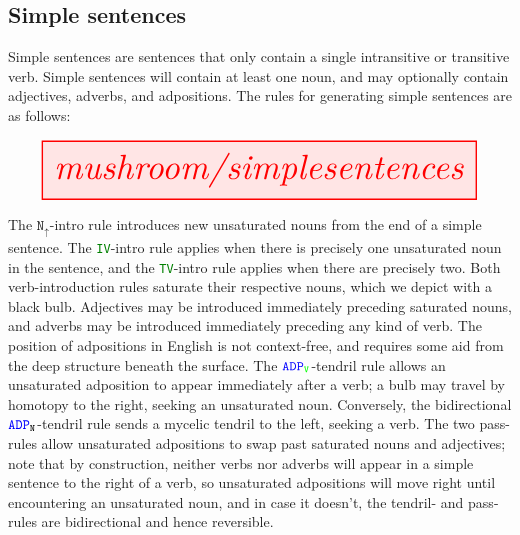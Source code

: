 

\subsection{Simple sentences}

Simple sentences are sentences that only contain a single intransitive or transitive verb. Simple sentences will contain at least one noun, and may optionally contain adjectives, adverbs, and adpositions. The rules for generating simple sentences are as follows:

\[
\resizebox{\textwidth}{!}{\tikzfig{mushroom/simplesentences}}
\]

The $\texttt{N}_\uparrow$-intro rule introduces new unsaturated nouns from the end of a simple sentence. The \textcolor{green}{\texttt{IV}}-intro rule applies when there is precisely one unsaturated noun in the sentence, and the \textcolor{green}{\texttt{TV}}-intro rule applies when there are precisely two. Both verb-introduction rules saturate their respective nouns, which we depict with a black bulb. Adjectives may be introduced immediately preceding saturated nouns, and adverbs may be introduced immediately preceding any kind of verb. The position of adpositions in English is not context-free, and requires some aid from the deep structure beneath the surface. The $\textcolor{blue}{\texttt{ADP}}_{\textcolor{green}{\texttt{V}}}$-tendril rule allows an unsaturated adposition to appear immediately after a verb; a bulb may travel by homotopy to the right, seeking an unsaturated noun. Conversely, the bidirectional $\textcolor{blue}{\texttt{ADP}}_{\texttt{N}}$-tendril rule sends a mycelic tendril to the left, seeking a verb. The two pass-rules allow unsaturated adpositions to swap past saturated nouns and adjectives; note that by construction, neither verbs nor adverbs will appear in a simple sentence to the right of a verb, so unsaturated adpositions will move right until encountering an unsaturated noun, and in case it doesn't, the tendril- and pass- rules are bidirectional and hence reversible.



